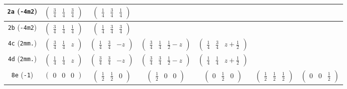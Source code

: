 \documentclass[fleqn,9pt,landscape]{jsarticle}
\begin{document}
\begin{center}
\begin{longtable}{ccccccc}
{\tt 2a} ({\tt -4m2}) & $ \begin{pmatrix} \frac{3}{4} & \frac{1}{4} & \frac{3}{4} \end{pmatrix} $ & $ \begin{pmatrix} \frac{1}{4} & \frac{3}{4} & \frac{1}{4} \end{pmatrix} $ & $  $ & $  $ & $  $ & $  $ \\ \hline
{\tt 2b} ({\tt -4m2}) & $ \begin{pmatrix} \frac{3}{4} & \frac{1}{4} & \frac{1}{4} \end{pmatrix} $ & $ \begin{pmatrix} \frac{1}{4} & \frac{3}{4} & \frac{3}{4} \end{pmatrix} $ & $  $ & $  $ & $  $ & $  $ \\ \hline
{\tt 4c} ({\tt 2mm.}) & $ \begin{pmatrix} \frac{3}{4} & \frac{1}{4} & z \end{pmatrix} $ & $ \begin{pmatrix} \frac{1}{4} & \frac{3}{4} & - z \end{pmatrix} $ & $ \begin{pmatrix} \frac{3}{4} & \frac{1}{4} & \frac{1}{2} - z \end{pmatrix} $ & $ \begin{pmatrix} \frac{1}{4} & \frac{3}{4} & z + \frac{1}{2} \end{pmatrix} $ & $  $ & $  $ \\ \hline
{\tt 4d} ({\tt 2mm.}) & $ \begin{pmatrix} \frac{1}{4} & \frac{1}{4} & z \end{pmatrix} $ & $ \begin{pmatrix} \frac{3}{4} & \frac{3}{4} & - z \end{pmatrix} $ & $ \begin{pmatrix} \frac{3}{4} & \frac{3}{4} & \frac{1}{2} - z \end{pmatrix} $ & $ \begin{pmatrix} \frac{1}{4} & \frac{1}{4} & z + \frac{1}{2} \end{pmatrix} $ & $  $ & $  $ \\ \hline
{\tt 8e} ({\tt -1}) & $ \begin{pmatrix} 0 & 0 & 0 \end{pmatrix} $ & $ \begin{pmatrix} \frac{1}{2} & \frac{1}{2} & 0 \end{pmatrix} $ & $ \begin{pmatrix} \frac{1}{2} & 0 & 0 \end{pmatrix} $ & $ \begin{pmatrix} 0 & \frac{1}{2} & 0 \end{pmatrix} $ & $ \begin{pmatrix} \frac{1}{2} & \frac{1}{2} & \frac{1}{2} \end{pmatrix} $ & $ \begin{pmatrix} 0 & 0 & \frac{1}{2} \end{pmatrix} $ \\

\end{longtable}
\end{center}
\end{document}
